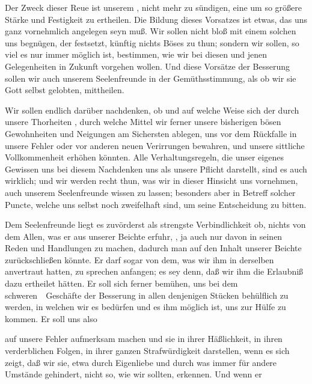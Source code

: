 \begin{aufza}
\item Der Zweck dieser Reue ist unserem , nicht mehr zu sündigen, eine um so größere Stärke und Festigkeit zu ertheilen. Die Bildung dieses Vorsatzes ist etwas, das uns ganz vornehmlich angelegen seyn muß. Wir sollen nicht bloß mit einem solchen uns begnügen, der  festsetzt, künftig nichts Böses zu thun; sondern wir sollen, so viel es nur immer möglich ist,  bestimmen, wie wir bei diesen und jenen Gelegenheiten in Zukunft vorgehen wollen. Und diese Vorsätze der Besserung sollen wir auch unserem Seelenfreunde in der Gemüthsstimmung, als ob wir sie Gott selbst gelobten, mittheilen.
\item Wir sollen endlich darüber nachdenken, ob und auf welche Weise sich der durch unsere Thorheiten , durch welche Mittel wir ferner unsere bisherigen bösen Gewohnheiten und Neigungen am Sichersten ablegen, uns vor dem Rückfalle in unsere Fehler oder vor anderen neuen Verirrungen bewahren, und unsere sittliche Vollkommenheit erhöhen könnten. Alle Verhaltungsregeln, die unser eigenes Gewissen uns bei diesem Nachdenken uns als unsere Pflicht darstellt, sind es auch wirklich; und wir werden recht thun, was wir in dieser Hinsicht uns vornehmen, auch unserem Seelenfreunde wissen zu lassen; besonders aber in Betreff solcher Puncte, welche uns selbst noch zweifelhaft sind, um seine Entscheidung zu bitten.
\item Dem Seelenfreunde liegt es zuvörderst als strengste Verbindlichkeit ob, nichts von dem Allen, was er aus unserer Beichte erfuhr, , ja auch nur  davon in seinen Reden und Handlungen zu machen, dadurch man auf den Inhalt unserer Beichte zurückschließen könnte. Er darf sogar  von dem, was wir ihm in derselben anvertraut hatten, zu sprechen anfangen; es sey denn, daß wir ihm die Erlaubniß dazu ertheilet hätten. Er soll sich ferner bemühen, uns bei dem schweren~\ Geschäfte der Besserung in allen denjenigen Stücken behülflich zu werden, in welchen wir es bedürfen und es ihm möglich ist, uns zur Hülfe zu kommen. Er soll uns also
\begin{aufzb}
\item auf unsere Fehler aufmerksam machen und sie in ihrer Häßlichkeit, in ihren verderblichen Folgen, in ihrer ganzen Strafwürdigkeit darstellen, wenn es sich zeigt, daß wir sie, etwa durch Eigenliebe und durch was immer für andere Umstände gehindert, nicht so, wie wir sollten, erkennen. Und wenn er

\end{aufzb}
\end{aufza}
